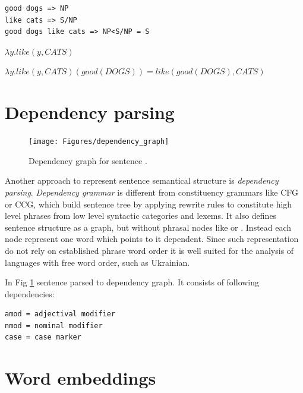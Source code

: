 \begin{verbatim}
good dogs => NP
like cats => S/NP
good dogs like cats => NP<S/NP = S
\end{verbatim}

$\lambda y.like(y, CATS)$

$\lambda y.like(y, CATS)(good(DOGS))=like(good(DOGS), CATS)$

\section{Dependency parsing}

\begin{figure}[h]
\centering
\texttt{[image: Figures/dependency\_graph]}
\decoRule
\caption[Syntax tree]{Dependency graph for sentence \protect\footnotemark.}
\label{fig:dependency_graph}
\end{figure}


Another approach to represent sentence semantical structure is \emph{dependency parsing}. \emph{Dependency grammar} is different from constituency grammars like CFG or CCG, which build sentence tree by applying rewrite rules to constitute high level phrases from low level syntactic categories and lexems. It also defines sentence structure as a graph, but without phrasal nodes like  or . Instead each node represent one word which points to it dependent. Since such representation do not rely on established phrase word order it is well suited for the analysis of languages with free word order, such as Ukrainian.



In Fig \ref{fig:dependency_graph} sentence  parsed to dependency graph. It consists of following dependencies: 

\begin{verbatim}
amod = adjectival modifier
nmod = nominal modifier
case = case marker
\end{verbatim}

\section{Word embeddings}


